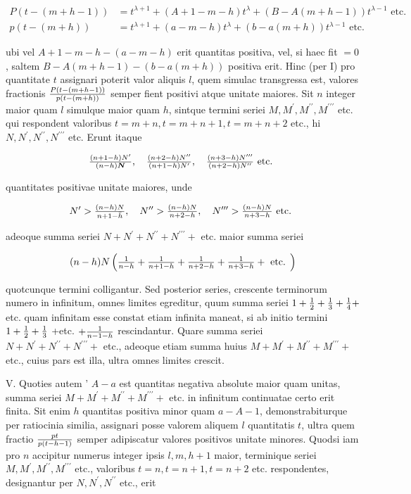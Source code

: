 \documentclass[twoside,12pt, showframe]{memoir}
\let\oldfrac\frac
\def\frac#1#2{\mathchoice{\tfrac{#1}{#2}}{\oldfrac{#1}{#2}}{\genfrac{}{}{}{2}{#1}{#2\mathstrut}}{\genfrac{}{}{}{3}{#1}{#2\mathstrut}}}
\begin{document}
\[
\begin{aligned}
P(t-(m+h-1)) & =t^{\lambda+1}+(A+1-m-h) t^{\lambda}+(B-A(m+h-1)) t^{\lambda-1} \text { etc. } \\
p(t-(m+h)) & =t^{\lambda+1}+(a-m-h) t^{\lambda}+(b-a(m+h)) t^{\lambda-1} \text { etc. }
\end{aligned}
\]

ubi vel \(A+1-m-h-(a-m-h)\) erit quantitas positiva, vel, si haec fit \(=0\), saltem \(B-A(m+h-1)-(b-a(m+h))\) positiva erit. Hinc (per I) pro quantitate \(t\) assignari poterit valor aliquis \(l\), quem simulac transgressa est, valores fractionis \(\frac{P(t-(m+h-1))}{p(t-(m+h))}\) semper fient positivi atque unitate maiores. Sit \(n\) integer
maior quam \(l\) simulque maior quam \(h\), sintque termini seriei \(M, M^{\prime}, M^{\prime \prime}, M^{\prime \prime \prime}\) etc. qui respondent valoribus \(t=m+n, t=m+n+1, t=m+n+2\) etc., hi \(N, N^{\prime}, N^{\prime \prime}, N^{\prime \prime \prime}\) etc. Erunt itaque

\[
\frac{(n+1-h) N^{\prime}}{(n-h) \boldsymbol{N}}, \quad \frac{(n+2-h) N^{\prime \prime}}{(n+1-h) N^{\prime}}, \quad \frac{(n+3-h) N^{\prime \prime \prime}}{(n+2-h) N^{\prime \prime}} \text { etc. }
\]

quantitates positivae unitate maiores, unde

\[
N^{\prime}>\frac{(n-h) N}{n+1-\bar{h}}, \quad N^{\prime \prime}>\frac{(n-h) N}{n+2-h}, \quad N^{\prime \prime \prime}>\frac{(n-h) N}{n+3-h} \text { etc. }
\]

adeoque summa seriei \(N+N^{\prime}+N^{\prime \prime}+N^{\prime \prime \prime}+\) etc. maior summa seriei

\[
(n-h) N\left(\frac{1}{n-h}+\frac{1}{n+1-h}+\frac{1}{n+2-h}+\frac{1}{n+3-h}+\text { etc. }\right)
\]

quotcunque termini colligantur. Sed posterior series, crescente terminorum numero in infinitum, omnes limites egreditur, quum summa seriei \(1+\frac{1}{2}+\frac{1}{3}+\frac{1}{4}+\) etc. quam infinitam esse constat etiam infinita maneat, si ab initio termini \(1+\frac{1}{2}+\frac{1}{3}\) +etc. \(+\frac{1}{n-1-h}\) rescindantur. Quare summa seriei \(N+N^{\prime}+N^{\prime \prime}+N^{\prime \prime \prime}+\) etc., adeoque etiam summa huius \(M+M^{\prime}+M^{\prime \prime}+M^{\prime \prime \prime}+\) etc., cuius pars est illa, ultra omnes limites crescit.

V. Quoties autem ' \(A-a\) est quantitas negativa absolute maior quam unitas, summa seriei \(M+M^{\prime}+M^{\prime \prime}+M^{\prime \prime \prime}+\) etc. in infinitum continuatae certo erit finita. Sit enim \(h\) quantitas positiva minor quam \(a-A-1\), demonstrabiturque per ratiocinia similia, assignari posse valorem aliquem \(l\) quantitatis \(t\), ultra quem fractio \(\frac{p t}{p(t-h-1)}\) semper adipiscatur valores positivos unitate minores. Quodsi iam pro \(n\) accipitur numerus integer ipsis \(l, m, h+1\) maior, terminique seriei \(M, M^{\prime}, M^{\prime \prime}, M^{\prime \prime \prime}\) etc., valoribus \(t=n, t=n+1, t=n+2\) etc. respondentes, designantur per \(N, N^{\prime}, N^{\prime \prime}\) etc., erit
\end{document}
